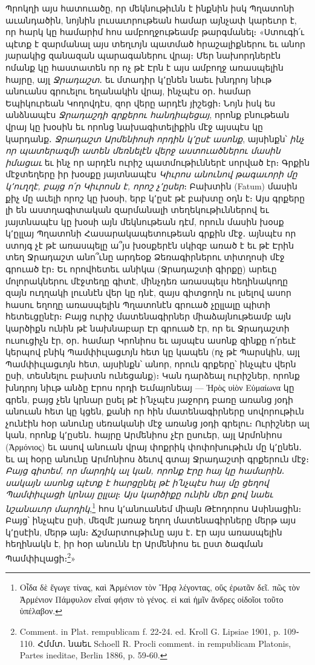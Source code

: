 \documentclass{article}
\begin{document}
{Պրոկղի այս հատուածը, որ մեկնութիւնն է ինքնին իսկ Պղատոնի աւանդածին, նոյնին լուսաւորութեան համար այնչափ կարեւոր է, որ հարկ կը համարիմ հոս ամբողջութեամբ թարգմանել։ «Ստուգի՛ւ պէտք է զարմանալ այս տեղւոյն պատմած հրաշալիքներու եւ անոր յարակից զանազան պարագաներու վրայ։ Մեր նախորդներէն ոմանք կը հաստատեն որ ոչ թէ Էրն է այս ամբողջ առասպելին հայրը, այլ \emph{Ջրադաշտ}․ եւ մտադիր կ՚ընեն նաեւ խնդրոյ նիւթ անուանս գրուելու եղանակին վրայ, ինչպէս օր․ համար Եպիկուրեան Կողովդէս, զոր վերը արդէն յիշեցի։ Նոյն իսկ ես անձնապէս \emph{Ջրադաշդի գրքերու հանդիպեցայ}, որոնք բնութեան վրայ կը խօսին եւ որոնց նախագիտելիքին մէջ այսպէս կը կարդանք․ \emph{Ջրադաշտ Արմենիոսի որդին կ՚ըսէ ասոնք}, այսինքն՝ \emph{ինչ որ պատերազմի ատեն մեռնելէն վերջ աստուածներու մասին իմացաւ} եւ ինչ որ արդէն ուրիշ պատմութիւններէ սորված էր։ Գրքին մէջտեղերը իր խօսքը յայտնապէս \emph{Կիւրոս անունով թագաւորի մը կ՚ուղղէ, բայց ո՛ր Կիւրոսն է, որոշ չ՚ըսեր}։ Բախտին (Fatum) մասին քիչ մը աւելի որոշ կը խօսի, երբ կ՚ըսէ թէ բախտը օդն է։ Այս գրքերը լի են աստղագիտական զարմանալի տեղեկութիւններով եւ յայտնապէս կը խօսի այն մեկնութեան դէմ, որուն մասին խօսք կ՚ըլլայ Պղատոնի Հասարակապետութեան գրքին մէջ․ այնպէս որ ստոյգ չէ թէ առասպելը ա՞յս խօսքերէն սկիզբ առած է եւ թէ Էրին տեղ Ջրադաշտ անո՞ւնը արդեօք Ձեռագիրներու տիտղոսի մէջ գրուած էր։ Եւ որովհետեւ անիկա (Ջրադաշտի գիրքը) արեւը մոլորակներու մէջտեղը գիտէ, մինչդեռ առասպելս հեղինակողը զայն ուղղակի լուսնէն վեր կը դնէ, զայս գիտցողն ու լսելով ասոր հասու եղողը առասպելին Պղատոնէն գրուած չըլլալը պիտի հետեւցընէր։ Բայց ուրիշ մատենագիրներ միաձայնութեամբ այն կարծիքն ունին թէ նախնաբար Էր գրուած էր, որ եւ Ջրադաշտի ուսուցիչն էր, օր․ համար Կրոնիոս եւ այսպէս ասոնք զինքը ո՛րեւէ կերպով բնիկ Պամփիւլացւոյն հետ կը կապեն (ոչ թէ Պարսկին, այլ Պամփիւլացւոյն հետ, այսինքն՝ անոր, որուն գրքերը՝ ինչպէս վերն ըսի, տեսնելու բախտն ունեցանք)։ Կան դարձեալ ուրիշներ, որոնք խնդրոյ նիւթ անձը Էրոս որդի Եւմայոնեայ — Ἠρὸς υἱὸν Εὐμαίωνα կը գրեն, բայց չեն կրնար ըսել թէ ի՛նչպէս յաջորդ բառը առանց յօդի անուան հետ կը կցեն, քանի որ հին մատենագիրները սովորութիւն չունէին հօր անունը սեռականի մէջ առանց յօդի գրելու։ Ուրիշներ ալ կան, որոնք կ՚ըսեն․ հայրը Արմենիոս չէր ըսուեր, այլ Արմոնիոս (Ἀρμόνιος) եւ ասով անուան վրայ փոքրիկ փոփոխութիւն մը կ՚ընեն․ եւ ալ հօրը անունը Արմոնիոս ձեւով գտայ Ջրադաշտի գրքերուն մէջ։ \emph{Բայց գիտեմ, որ մարդիկ ալ կան, որոնք Էրը հայ կը համարին․ սակայն ասոնց պէտք է հարցընել թէ ի՛նչպէս հայ մը ցեղով Պամփիւլացի կրնայ ըլլալ}։ \emph{Այս կարծիքը ունին մեր քով նաեւ նշանաւոր մարդիկ},\footnote{Οἶδα δὲ ἔγωγε τίνας, καὶ Ἀρμένιον τὸν Ἤρᾳ λέγοντας, οὕς ἐρωτᾶν δεῖ. πῶς τὸν Ἀρμένιον Πάμφυλον εἶναί φήσιν τὸ γένος. εἰ καὶ ἡμῖν ἄνδρες οἰδοῖοι τοῦτο ὑπέλαβον.} հոս կ՚անուանեմ միայն Թէոդորոս Ասինացին։ Բայց՝ ինչպէս ըսի, մեզմէ յառաջ եղող մատենագիրները մերթ այս կ՚ըսէին, մերթ այն։ Ճշմարտութիւնը այս է․ Էր այս առասպելին հեղինակն է, իր հօր անունն էր Արմենիոս եւ ըստ ծագման Պամփիւլացի։\footnote{Comment. in Plat. rempublicam f. 22֊24. ed. Kroll G. Lipsiae 1901, p. 109֊110. Հմմտ․ նաեւ Schoell R. Procli comment. in rempublicam Platonis, Partes ineditae, Berlin 1886, p. 59֊60.}»

}
\end{document}
